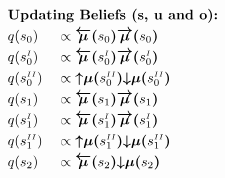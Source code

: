 \documentclass[fleqn]{article}
\begin{document}
\begin{minipage}[t]{0.5\textwidth}
    \begin{alignat}{2}
         & \rlap{\text{\bfseries Updating Beliefs (s, u and o):}} \nonumber                                                                                                                                                                                                          \\
         & q(s_0)                                                           &  & \propto \bm{\overleftarrow{\mu}(}s_0\bm{)} \bm{\overrightarrow{\mu}(}s_0\bm{)}                                                                                                                      \\
         & q(s^{\scriptscriptstyle I}_0)                                    &  & \propto \bm{\overleftarrow{\mu}(}s^{\scriptscriptstyle I}_0\bm{)} \bm{\overrightarrow{\mu}(}s^{\scriptscriptstyle I}_0\bm{)}                                                                        \\
         & q(s^{\scriptscriptstyle II}_0)                                   &  & \propto \bm{{\uparrow}{\mu}(}s^{\scriptscriptstyle II}_0\bm{)} \bm{{\downarrow}{\mu}(}s^{\scriptscriptstyle II}_0\bm{)}                                                                             \\
         & q(s_1)                                                           &  & \propto \bm{\overleftarrow{\mu}(}s_1\bm{)} \bm{\overrightarrow{\mu}(}s_1\bm{)}                                                                                                                      \\
         & q(s^{\scriptscriptstyle I}_1)                                    &  & \propto \bm{\overleftarrow{\mu}(}s^{\scriptscriptstyle I}_1\bm{)} \bm{\overrightarrow{\mu}(}s^{\scriptscriptstyle I}_1\bm{)}                                                                        \\
         & q(s^{\scriptscriptstyle II}_1)                                   &  & \propto \bm{{\uparrow}{\mu}(}s^{\scriptscriptstyle II}_1\bm{)} \bm{{\downarrow}{\mu}(}s^{\scriptscriptstyle II}_1\bm{)}                                                                             \\
         & q(s_2)                                                           &  & \propto \bm{\overleftarrow{\mu}(}s_2\bm{)} \bm{{\downarrow}{\mu}(}s_2\bm{)}                                                                                                                         \\

\end{alignat}
\end{minipage}
\end{document}
